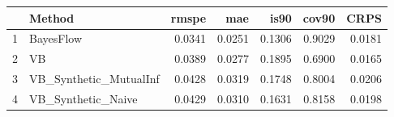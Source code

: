 \documentclass[12pt]{article}
\begin{document}
\thispagestyle{empty}
\begin{table}[ht]
\centering
\begin{tabular}{rlrrrrr}
  \hline
 & Method & rmspe & mae & is90 & cov90 & CRPS \\ 
  \hline
1 & BayesFlow & 0.0341 & 0.0251 & 0.1306 & 0.9029 & 0.0181 \\ 
  2 & VB & 0.0389 & 0.0277 & 0.1895 & 0.6900 & 0.0165 \\ 
  3 & VB\_Synthetic\_MutualInf & 0.0428 & 0.0319 & 0.1748 & 0.8004 & 0.0206 \\ 
  4 & VB\_Synthetic\_Naive & 0.0429 & 0.0310 & 0.1631 & 0.8158 & 0.0198 \\ 
   \hline
\end{tabular}
\end{table}
\end{document}
